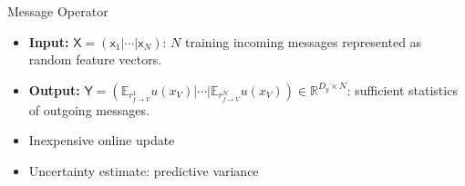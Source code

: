 \documentclass[english]{beamer}
\newcommand{\factor}{f}				%
\newcommand{\outV}{V}                         %
\begin{document}
\begin{frame}
\begin{columns}[t]
\begin{block}{Message Operator }
\begin{itemize}
    \item \textbf{Input:} $\mathsf{X}=\left(\mathsf{x}_{1}|\cdots|\mathsf{x}_{N}\right)$: 
        $N$ training incoming messages represented as random feature vectors.
    \item \textbf{Output:} $\mathsf{Y}=\left(\mathbb{E}_{r_{\factor\rightarrow
        \outV}^{1}}u(x_{\outV})|\cdots|\mathbb{E}_{r_{f\rightarrow
        \outV}^{N}}u(x_{\outV})\right)\in\mathbb{R}^{D_{y}\times N}$: 
        sufficient statistics of outgoing messages.
    \item Inexpensive online update
    \item Uncertainty estimate: predictive variance
\end{itemize}

%


%


\end{block}
\end{columns}
\end{frame}
\end{document}

